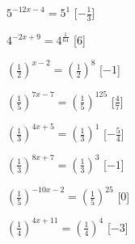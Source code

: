 \begin{esercizio}
\begin{multicols}{2}
\begin{enumeratea}
  \item  \(5^{-12 x -4} = 5^{1}\)
   \hfill [\(-\frac{1}{3}\)]
  \item  \(4^{-2 x +9} = 4^{\frac{1}{64}}\)
   \hfill [\(6\)]
  \item  \(\left(\frac{1}{2}\right)^{x -2} = \left(\frac{1}{2}\right)^{8}\)
   \hfill [\(-1\)]
  \item  \(\left(\frac{1}{5}\right)^{7 x -7} = \left(\frac{1}{5}\right)^{125}\)
   \hfill [\(\frac{4}{7}\)]
  \item  \(\left(\frac{1}{3}\right)^{4 x +5} = \left(\frac{1}{3}\right)^{1}\)
   \hfill [\(-\frac{5}{4}\)]
  \item  \(\left(\frac{1}{3}\right)^{8 x +7} = \left(\frac{1}{3}\right)^{3}\)
   \hfill [\(-1\)]
  \item  \(\left(\frac{1}{5}\right)^{-10 x -2} = \left(\frac{1}{5}\right)^{25}\)
   \hfill [\(0\)]
  \item  \(\left(\frac{1}{4}\right)^{4 x +11} = \left(\frac{1}{4}\right)^{4}\)
   \hfill [\(-3\)]
 \end{enumeratea}
 \end{multicols}
\end{esercizio}


